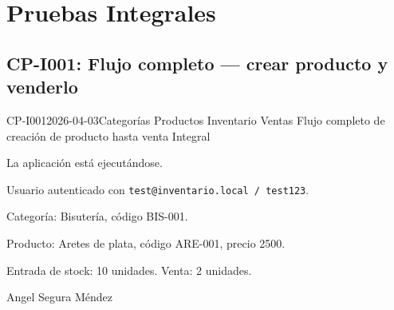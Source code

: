  
\section{Pruebas Integrales}

\subsection{CP-I001: Flujo completo --- crear producto y venderlo}
\def\cpPasos{%
  \item Crear categoría ``Bisutería'' (código BIS-001).
  \item Crear producto ``Aretes de plata'' asociado a la categoría, precio \CRC{}2500.
  \item Intentar vender sin stock; observar respuesta.
  \item Registrar entrada de 10 unidades en Inventario.
  \item Crear venta de 2 unidades de ``Aretes de plata''.
  \item Verificar stock final en Inventario.}
\def\cpResultadoE{%
  \item Stock final = 8 (10 entrada $-$ 2 venta).
  \item Sistema bloquea venta sin stock.}
\def\cpResultadoO{Al intentar vender con stock 0, el sistema mostró error ``stock
  insuficiente para el movimiento''. Luego de registrar 10 unidades, la venta de 2
  unidades se completó correctamente. Stock final = 8. Flujo completo funcionó.}
\casoprueba
  {CP-I001}{2026-04-03}{Categorías \arr{} Productos \arr{} Inventario \arr{} Ventas}
  {Flujo completo de creación de producto hasta venta}
  {Integral}{\estadoAprobado}
  {\item La aplicación está ejecutándose.
   \item Usuario autenticado con \texttt{test@inventario.local / test123}.}
  {\item Categoría: Bisutería, código BIS-001.
   \item Producto: Aretes de plata, código ARE-001, precio \CRC{}2500.
   \item Entrada de stock: 10 unidades. Venta: 2 unidades.}
  {Angel Segura Méndez}


